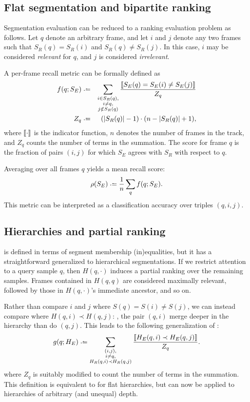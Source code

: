 \documentclass{article}
\begin{document}
\subsection{Flat segmentation and bipartite ranking}

Segmentation evaluation can be reduced to a ranking evaluation problem as follows.
Let $q$ denote an arbitrary frame, and let $i$ and $j$ denote any two frames such that $S_R(q) = S_R(i)$ and $S_R(q) \neq S_R(j)$.
In this case, $i$ may be considered \emph{relevant} for $q$, and $j$ is considered \emph{irrelevant}.

A per-frame recall metric can be formally defined as
\begin{align}
f(q ; S_E) &\defeq &
\sum_{\substack{i \in S_R(q), \\ i \neq q,\\ j \notin S_R(q)}}
\frac{\ind{S_E(q) = S_E(i) \neq S_E(j) }}{Z_q} \label{flatrecall}\\
Z_q &\defeq& (|S_R(q)| - 1)\cdot (n - |S_R(q)| + 1), \label{flatrecallnorm}
\end{align}
where $\left\llbracket\cdot\right\rrbracket$ is the indicator function, $n$ denotes the number of frames in the track, and $Z_q$
counts the number of terms in the summation.
The score for frame $q$ is the fraction of pairs $(i, j)$ for which $S_E$
agrees with $S_R$ with respect to $q$.

Averaging over all frames $q$ yields a mean recall score:
\begin{equation}
\rho(S_E) \defeq \frac{1}{n} \sum_q f(q ; S_E).\label{avgrecall}
\end{equation}
This metric can be interpreted as a classification accuracy over triples $(q, i, j)$.


\subsection{Hierarchies and partial ranking}

 is defined in terms of segment membership (in)equalities, but it has a straightforward 
generalized to hierarchical segmentations.
If we restrict attention to a query sample $q$, then $H(q, \cdot)$ induces a partial ranking over the remaining samples.
Frames contained in $H(q, q)$ are considered maximally relevant, followed by those in $H(q, \cdot)$'s immediate ancestor, and so on.

Rather than compare $i$ and $j$ where $S(q) = S(i) \neq S(j)$, we can instead compare where
$H(q, i) \prec H(q, j)$: \ie, the pair $(q,i)$ merge deeper in the hierarchy than do $(q,j)$.
This leads to the following generalization of :
\begin{equation}
g(q ; H_E) \defeq \sum_{\substack{(i, j),\\ i \neq q,\\ H_R(q, i) \prec H_R(q, j)}}
\frac{\ind{H_E(q, i) \prec H_E(q, j)}}{Z_q}.\label{hierrecall}
\end{equation}
where $Z_q$ is suitably modified to count the number of terms in the summation.
This definition is equivalent to  for flat hierarchies, but can now be applied to
hierarchies of arbitrary (and unequal) depth.
\end{document}
